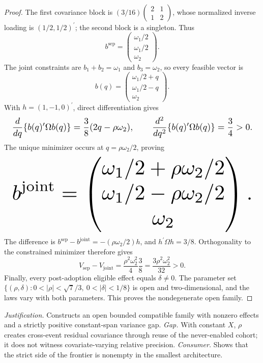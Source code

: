 \documentclass{article}
\begin{document}
\begin{proof}
The first covariance block is \((3/16)\begin{pmatrix}2&1\\1&2\end{pmatrix}\), whose normalized inverse loading is \((1/2,1/2)^{\prime}\); the second block is a singleton. Thus
\[
 b^{\mathrm{sep}}=
 \begin{pmatrix}\omega_1/2\\ \omega_1/2\\ \omega_2\end{pmatrix}.
\]
The joint constraints are \(b_1+b_2=\omega_1\) and \(b_3=\omega_2\), so every feasible vector is
\[
 b(q)=
 \begin{pmatrix}
 \omega_1/2+q\\
 \omega_1/2-q\\
 \omega_2
 \end{pmatrix}.
\]
With \(h=(1,-1,0)^{\prime}\), direct differentiation gives
\[
\makebox[\linewidth][c]{\resizebox{0.98\linewidth}{!}{\(\displaystyle \frac{d}{dq}\{b(q)^{\prime}\Omega b(q)\}
 =\frac38(2q-\rho\omega_2),
 \qquad
 \frac{d^2}{dq^2}\{b(q)^{\prime}\Omega b(q)\}=\frac34>0.\)}}
\]
The unique minimizer occurs at \(q=\rho\omega_2/2\), proving
\[
\makebox[\linewidth][c]{\resizebox{0.98\linewidth}{!}{\(\displaystyle b^{\mathrm{joint}}=
 \begin{pmatrix}
 \omega_1/2+\rho\omega_2/2\\
 \omega_1/2-\rho\omega_2/2\\
 \omega_2
 \end{pmatrix}.\)}}
\]
The difference is \(b^{\mathrm{sep}}-b^{\mathrm{joint}}=-(\rho\omega_2/2)h\), and \(h^{\prime}\Omega h=3/8\). Orthogonality to the constrained minimizer therefore gives
\[
 V_{\mathrm{sep}}-V_{\mathrm{joint}}
 =\frac{\rho^2\omega_2^2}{4}\frac38
 =\frac{3\rho^2\omega_2^2}{32}>0.
\]
Finally, every post-adoption eligible effect equals \(\delta\ne0\). The parameter set \(\{(\rho,\delta):0<|\rho|<\sqrt7/3,\ 0<|\delta|<1/8\}\) is open and two-dimensional, and the laws vary with both parameters. This proves the nondegenerate open family.
\end{proof}
\par\smallskip\noindent \textit{Justification.} Constructs an open bounded compatible family with nonzero effects and a strictly positive constant-span variance gap. \textit{Gap.} With constant \(X\), \(\rho\) creates cross-event residual covariance through reuse of the never-enabled cohort; it does not witness covariate-varying relative precision. \textit{Consumer.} Shows that the strict side of the frontier is nonempty in the smallest architecture.
\end{document}
